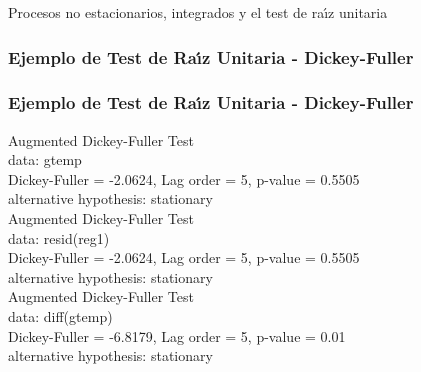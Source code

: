 \documentclass[spanish,xcolor=table]{beamer}
\begin{document}
\begin{section}{Procesos no estacionarios, integrados y el test de ra\'{\i}z unitaria}
\begin{frame}
\end{frame}

\begin{frame}
\frametitle{Ejemplo de Test de Ra\'{\i}z Unitaria - Dickey-Fuller}


\end{frame}
\begin{frame}
\frametitle{Ejemplo de Test de Ra\'{\i}z Unitaria - Dickey-Fuller}

Augmented Dickey-Fuller Test\\
data:  gtemp\\
Dickey-Fuller = -2.0624, Lag order = 5, p-value =
0.5505\\
alternative hypothesis: stationary\\
\vspace{5mm}	    
Augmented Dickey-Fuller Test\\
data:  resid(reg1)\\
Dickey-Fuller = -2.0624, Lag order = 5, p-value =
0.5505\\
alternative hypothesis: stationary\\
\vspace{5mm}	    
Augmented Dickey-Fuller Test\\
data:  diff(gtemp)\\
Dickey-Fuller = -6.8179, Lag order = 5, p-value = 0.01\\
alternative hypothesis: stationary\\
\end{frame}

\end{section}
\end{document}
